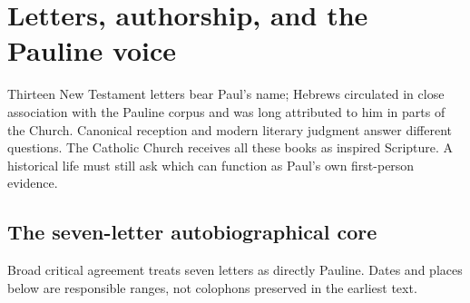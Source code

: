 \section{Letters, authorship, and the Pauline voice}\label{sec:paul-letters}

Thirteen New Testament letters bear Paul's name; Hebrews circulated in close
association with the Pauline corpus and was long attributed to him in parts of
the Church. Canonical reception and modern literary judgment answer different
questions. The Catholic Church receives all these books as inspired
Scripture. A historical life must still ask which can function as Paul's own
first-person evidence.

\subsection{The seven-letter autobiographical core}

Broad critical agreement treats seven letters as directly Pauline. Dates and
places below are responsible ranges, not colophons preserved in the earliest
text.

